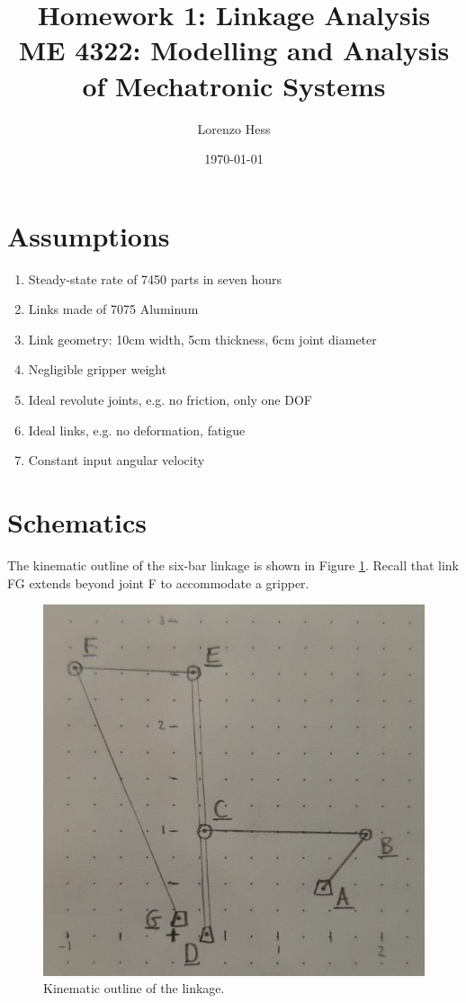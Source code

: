 \documentclass[12pt]{article}
\author{Lorenzo Hess}
\date{\today}
\title{Homework 1: Linkage Analysis\\
{\large ME 4322: Modelling and Analysis of Mechatronic Systems}}
\let\oldToC\tableofcontents
\renewcommand{\tableofcontents}{\begin{singlespace}\oldToC\end{singlespace}}
\begin{document}
\maketitle
\tableofcontents

\newpage
\section{Assumptions}%
\label{assum}

\begin{enumerate}
  \item Steady-state rate of 7450 parts in seven hours
  \item Links made of 7075 Aluminum
  \item Link geometry: 10cm width, 5cm thickness, 6cm joint diameter
  \item Negligible gripper weight
  \item Ideal revolute joints, e.g. no friction, only one DOF
  \item Ideal links, e.g. no deformation, fatigue
  \item Constant input angular velocity
\end{enumerate}

\section{Schematics}%
\label{schematics}

The kinematic outline of the six-bar linkage is shown in Figure \ref{fig:kin-outline}. Recall that link FG extends beyond joint F to accommodate a gripper.

\begin{figure}[H]
  \centering
  \includegraphics[scale=0.25]{../kinematic-outline.jpeg}
  \caption{\label{fig:kin-outline}Kinematic outline of the linkage.}
\end{figure}
\end{document}
